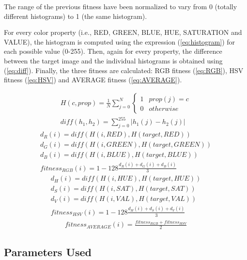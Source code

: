 \documentclass[a4paper,twoside]{article}
\begin{document}
The range of the previous fitness have been normalized to vary from 0 (totally different histograms) to 1 (the same histogram).

For every color property (i.e., RED, GREEN, BLUE, HUE, SATURATION and VALUE), the histogram is computed using the expression (\ref{eq:histogram}) for each possible value (0-255). Then, again for every property, the difference between the target image and the individual histograms is obtained using (\ref{eq:diff}). Finally, the three fitness are calculated: RGB fitness (\ref{eq:RGB}), HSV fitness (\ref{eq:HSV}) and AVERAGE fitness (\ref{eq:AVERAGE}).

\begin{eqnarray}
	\label{eq:histogram}
	H(c, prop) = \frac{1}{N}\sum_{j=0}^N \left\{\begin{matrix}
1 & prop(j) = c\\ 
0 & otherwise
\end{matrix}\right. \\
\label{eq:diff}
diff(h_1, h_2) = \sum_{j=0}^{255} |h_1(j) - h_2(j)|
\end{eqnarray}
\begin{eqnarray}
	d_R(i) = diff(H(i, RED), H(target, RED))\\
	d_G(i) = diff(H(i, GREEN), H(target, GREEN))\\
	d_B(i) =  diff(H(i, BLUE), H(target, BLUE))\\
	\label{eq:RGB}
	fitness_{RGB}(i) = 1 - 128\frac{d_R(i) + d_G(i) + d_B(i)}{3}
\end{eqnarray}
\begin{eqnarray}
	d_H(i) = diff(H(i, HUE), H(target, HUE))\\
	d_S(i) = diff(H(i, SAT), H(target, SAT))\\
	d_V(i) =  diff(H(i, VAL), H(target, VAL))\\
	\label{eq:HSV}
	fitness_{HSV}(i) = 1 - 128\frac{d_H(i) + d_S(i) + d_V(i)}{3}
\end{eqnarray}
\begin{eqnarray}
	\label{eq:AVERAGE}
	fitness_{AVERAGE}(i) = \frac{fitness_{RGB}+fitness_{HSV}}{2}
\end{eqnarray}


\subsection{Parameters Used}
\end{document}
